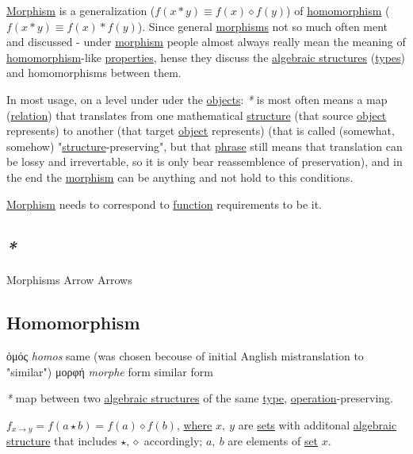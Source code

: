 \documentclass[a4paper,14pt,oneside]{book}
\begin{document}
\hyperref[orgcfa41a6]{Morphism} is a generalization (\(f(x*y) \equiv f(x) \diamond f(y)\)) of \hyperref[org829f1c4]{homomorphism} (\(f(x*y) \equiv f(x) * f(y)\)).
Since general \hyperref[orgfb70910]{morphisms} not so much often ment and discussed - under \hyperref[orgcfa41a6]{morphism} people almost always really mean the meaning of \hyperref[org829f1c4]{homomorphism}-like \hyperref[orgaebb0b7]{properties}, hense they discuss the \hyperref[org78367b9]{algebraic structures} (\hyperref[org91cf53a]{types}) and homomorphisms between them.

In most usage, on a level under uder the \hyperref[org88e24d2]{objects}: \emph{*} is most often means a map (\hyperref[orgdeb75cd]{relation}) that translates from one mathematical \hyperref[org105c77d]{structure} (that source \hyperref[org8d6cd26]{object} represents) to another (that target \hyperref[org8d6cd26]{object} represents) (that is called (somewhat, somehow) "\hyperref[org105c77d]{structure}-preserving", but that \hyperref[org2ebe893]{phrase} still means that translation can be lossy and irrevertable, so it is only bear reassemblence of preservation), and in the end the \hyperref[orgcfa41a6]{morphism} can be anything and not hold to this conditions.

\hyperref[orgcfa41a6]{Morphism} needs to correspond to \hyperref[orgc39a15c]{function} requirements to be it.

\subsection{\emph{*}}
\label{sec:org42daed1}

\label{orgfb70910}Morphisms
\label{org0b51b24}Arrow
\label{org8dc36eb}Arrows

\subsection{\label{org829f1c4}Homomorphism}
\label{sec:orgbc34d97}
ὁμός \emph{homos} same (was chosen becouse of initial Anglish mistranslation to "similar")
μορφή \emph{morphe} form
similar form

\emph{*} map between two \hyperref[org78367b9]{algebraic structures} of the same \hyperref[orgde40363]{type}, \hyperref[orgf96349c]{operation}-preserving.

\(f_{x \to y} = f(a \star b) = f(a) \diamond f(b)\),
\hyperref[orgbe7070f]{where} \(x,\ y\) are \hyperref[org8162ad1]{sets} with additonal \hyperref[org9703b42]{algebraic structure} that includes \(\star, \diamond\) accordingly; \(a,\ b\) are elements of \hyperref[org28abdc9]{set} \(x\).
\end{document}
